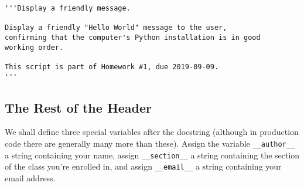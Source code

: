 \begin{verbatim}
'''Display a friendly message.

Display a friendly "Hello World" message to the user,
confirming that the computer's Python installation is in good
working order.

This script is part of Homework #1, due 2019-09-09.
'''
\end{verbatim}

\subsection{The Rest of the Header}

We shall define three special variables after the docstring (although in production code there are generally many more than these).  Assign the variable \texttt{__author__} a string containing your name, assign \texttt{__section__} a string containing the section of the class you're enrolled in, and assign \texttt{__email__} a string containing your email address.


